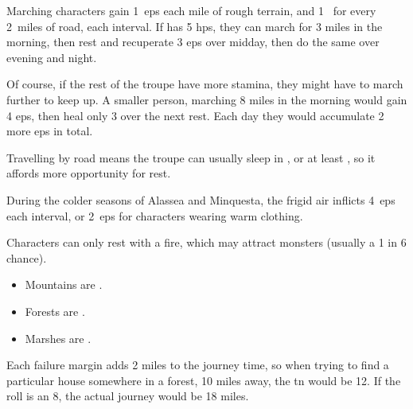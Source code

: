 \begin{multicols}{2}

Marching characters gain 1~\glspl{ep} each mile of rough terrain, and 1~ for every 2~miles of road, each \gls{interval}.
If  has 5 \glspl{hp}, they can march for 3 miles in the morning, then rest and recuperate 3 \glspl{ep} over midday, then do the same over evening and night.

Of course, if the rest of the troupe have more stamina, they might have to march further to keep up.
A smaller person, marching 8 miles in the morning would gain 4 \glspl{ep}, then heal only 3 over the next rest.
Each day they would accumulate 2 more \glspl{ep} in total.

Travelling by road means the troupe can usually sleep in ,  or at least , so it affords more opportunity for rest.

During the colder seasons of \gls{Alassea} and \gls{Minquesta}, the frigid air inflicts 4~\glspl{ep} each \gls{interval}, or 2~\glspl{ep} for characters wearing warm clothing.

Characters can only rest with a fire, which may attract monsters (usually a 1 in 6 chance).


\begin{itemize}
  \item
    Mountains are \tn[8].
  \item
    Forests are \tn[11].
  \item
    Marshes are \tn[12].
\end{itemize}

\noindent
Each failure margin adds 2 miles to the journey time, so when trying to find a particular house somewhere in a forest, 10 miles away, the \gls{tn} would be 12.
If the roll is an 8, the actual journey would be 18 miles.



\end{multicols}
